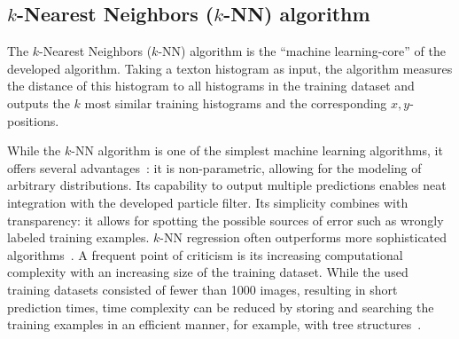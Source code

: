 \documentclass[11pt]{report}
\begin{document}
\subsection{$k$-Nearest Neighbors ($k$-NN) algorithm}
\label{sec:knn}

The $k$-Nearest Neighbors ($k$-NN) algorithm is the ``machine
learning-core'' of the developed algorithm. Taking a texton histogram
as input, the algorithm measures the distance of this histogram to all
histograms in the training dataset and outputs the $k$ most similar
training histograms and the corresponding $x,y$-positions.

While the $k$-NN algorithm is one of the simplest machine learning
algorithms, it offers several advantages~\cite{kordos2010we}: it is
non-parametric, allowing for the modeling of arbitrary
distributions. Its capability to output multiple predictions enables
neat integration with the developed particle filter. Its simplicity
combines with transparency: it allows for spotting the possible
sources of error such as wrongly labeled training examples. $k$-NN
regression often outperforms more sophisticated
algorithms~\cite{knn}. A frequent point of criticism is its increasing
computational complexity with an increasing size of the training
dataset. While the used training datasets consisted of fewer than 1000
images, resulting in short prediction times, time complexity can be
reduced by storing and searching the training examples in an efficient
manner, for example, with tree structures~\cite{bhatia2010survey}.

\end{document}
